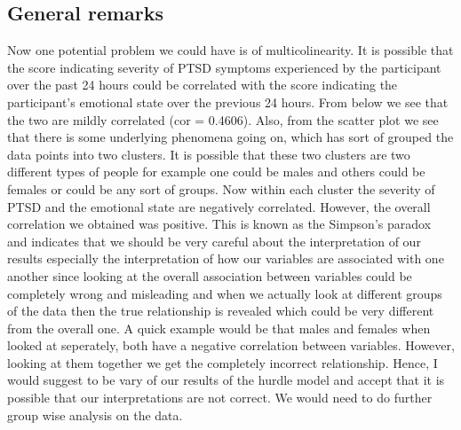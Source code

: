 \documentclass{article}\usepackage[]{graphicx}\usepackage[]{color}
\begin{document}
\subsection*{General remarks}


Now one potential problem we could have is of multicolinearity. It is possible that the score indicating severity of PTSD symptoms experienced by the participant over the past 24 hours could be correlated with the score indicating the participant's emotional state over the previous 24 hours. From below we see that the two are mildly correlated (cor = 0.4606). Also, from the scatter plot we see that there is some underlying phenomena going on, which has sort of grouped the data points into two clusters. It is possible that these two clusters are two different types of people for example one could be males and others could be females or could be any sort of groups. Now within each cluster the severity of PTSD and the emotional state are negatively correlated. However, the overall correlation we obtained was positive. This is known as the Simpson's paradox and indicates that we should be very careful about the interpretation of our results especially the interpretation of how our variables are associated with one another since looking at the overall association between variables could be completely wrong and misleading and when we actually look at different groups of the data then the true relationship is revealed which could be very different from the overall one. A quick example would be that males and females when looked at seperately, both have a negative correlation between variables. However, looking at them together we get the completely incorrect relationship. Hence, I would suggest to be vary of our results of the hurdle model and accept that it is possible that our interpretations are not correct. We would need to do further group wise analysis on the data. 
\end{document}
